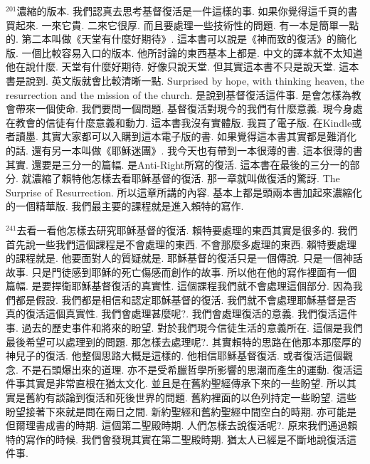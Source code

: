 \documentclass{book}
\begin{document}
$^{201}$濃縮的版本.
我們認真去思考基督復活是一件這樣的事.
如果你覺得這千頁的書買起來.
一來它貴.
二來它很厚.
而且要處理一些技術性的問題.
有一本是簡單一點的.
第二本叫做《天堂有什麼好期待》.
這本書可以說是《神而致的復活》的簡化版.
一個比較容易入口的版本.
他所討論的東西基本上都是.
中文的譯本就不太知道他在說什麼.
天堂有什麼好期待.
好像只說天堂.
但其實這本書不只是說天堂.
這本書是說到.
英文版就會比較清晰一點.
Surprised by hope, with thinking heaven, the resurrection and the mission of the church.
是說到基督復活這件事.
是會怎樣為教會帶來一個使命.
我們要問一個問題.
基督復活對現今的我們有什麼意義.
現今身處在教會的信徒有什麼意義和動力.
這本書我沒有實體版.
我買了電子版.
在Kindle或者讀墨.
其實大家都可以入購到這本電子版的書.
如果覺得這本書其實都是難消化的話.
還有另一本叫做《耶穌迷團》.
我今天也有帶到一本很薄的書.
這本很薄的書其實.
還要是三分一的篇幅.
是Anti-Right所寫的復活.
這本書在最後的三分一的部分.
就濃縮了賴特他怎樣去看耶穌基督的復活.
那一章就叫做復活的驚訝.
The Surprise of Resurrection.
所以這章所講的內容.
基本上都是頭兩本書加起來濃縮化的一個精華版.
我們最主要的課程就是進入賴特的寫作.

$^{241}$去看一看他怎樣去研究耶穌基督的復活.
賴特要處理的東西其實是很多的.
我們首先說一些我們這個課程是不會處理的東西.
不會那麼多處理的東西.
賴特要處理的課程就是.
他要面對人的質疑就是.
耶穌基督的復活只是一個傳說.
只是一個神話故事.
只是門徒感到耶穌的死亡傷感而創作的故事.
所以他在他的寫作裡面有一個篇幅.
是要捍衛耶穌基督復活的真實性.
這個課程我們就不會處理這個部分.
因為我們都是假設.
我們都是相信和認定耶穌基督的復活.
我們就不會處理耶穌基督是否真的復活這個真實性.
我們會處理甚麼呢?.
我們會處理復活的意義.
我們復活這件事.
過去的歷史事件和將來的盼望.
對於我們現今信徒生活的意義所在.
這個是我們最後希望可以處理到的問題.
那怎樣去處理呢?.
其實賴特的思路在他那本那麼厚的神兒子的復活.
他整個思路大概是這樣的.
他相信耶穌基督復活.
或者復活這個觀念.
不是石頭爆出來的道理.
亦不是受希臘哲學所影響的思潮而產生的運動.
復活這件事其實是非常直根在猶太文化.
並且是在舊約聖經傳承下來的一些盼望.
所以其實是舊約有談論到復活和死後世界的問題.
舊約裡面的以色列持定一些盼望.
這些盼望接著下來就是問在兩日之間.
新約聖經和舊約聖經中間空白的時期.
亦可能是但爾理書成書的時期.
這個第二聖殿時期.
人們怎樣去說復活呢?.
原來我們通過賴特的寫作的時候.
我們會發現其實在第二聖殿時期.
猶太人已經是不斷地說復活這件事.
\end{document}
